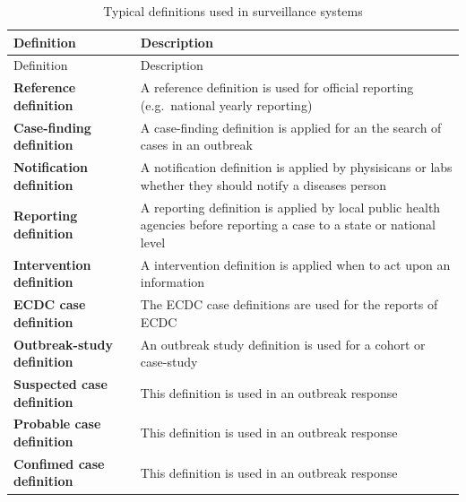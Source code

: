 \documentclass[
  letterpaper,
  DIV=11,
  numbers=noendperiod]{scrreprt}
\begin{document}
\begin{longtable}[]{@{}
  >{\raggedright\arraybackslash}p{}
  >{\raggedright\arraybackslash}p{}@{}}
\caption{Typical definitions used in surveillance
systems}\tabularnewline
\toprule\noalign{}
\begin{minipage}[b]{\linewidth}\raggedright
Definition
\end{minipage} & \begin{minipage}[b]{\linewidth}\raggedright
Description
\end{minipage} \\
\midrule\noalign{}
\endfirsthead
\toprule\noalign{}
\begin{minipage}[b]{\linewidth}\raggedright
Definition
\end{minipage} & \begin{minipage}[b]{\linewidth}\raggedright
Description
\end{minipage} \\
\midrule\noalign{}
\endhead
\bottomrule\noalign{}
\endlastfoot
\textbf{Reference definition} & A reference definition is used for
official reporting (e.g.~national yearly reporting) \\
\textbf{Case-finding definition} & A case-finding definition is applied
for an the search of cases in an outbreak \\
\textbf{Notification definition} & A notification definition is applied
by physisicans or labs whether they should notify a diseases person \\
\textbf{Reporting definition} & A reporting definition is applied by
local public health agencies before reporting a case to a state or
national level \\
\textbf{Intervention definition} & A intervention definition is applied
when to act upon an information \\
\textbf{ECDC case definition} & The ECDC case definitions are used for
the reports of ECDC \\
\textbf{Outbreak-study definition} & An outbreak study definition is
used for a cohort or case-study \\
\textbf{Suspected case definition} & This definition is used in an
outbreak response \\
\textbf{Probable case definition} & This definition is used in an
outbreak response \\
\textbf{Confimed case definition} & This definition is used in an
outbreak response \\

\end{longtable}
\end{document}
